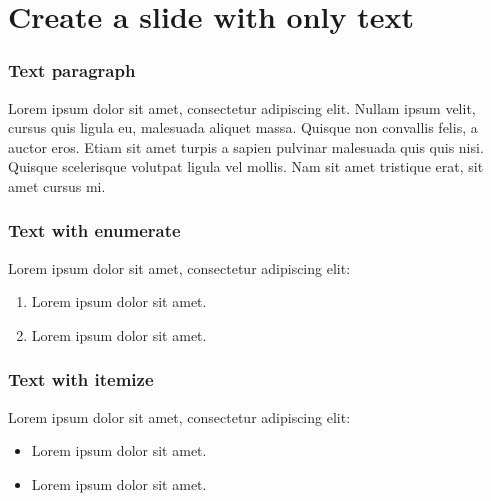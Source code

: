 
\section{Create a slide with only text} %


\begin{frame}
	\frametitle{Text paragraph}
    Lorem ipsum dolor sit amet, consectetur adipiscing elit. Nullam ipsum velit, cursus quis ligula eu, malesuada aliquet massa. Quisque non convallis felis, a auctor eros. Etiam sit amet turpis a sapien pulvinar malesuada quis quis nisi. Quisque scelerisque volutpat ligula vel mollis. Nam sit amet tristique erat, sit amet cursus mi. 
\end{frame}


\begin{frame}
	\frametitle{Text with enumerate }
     Lorem ipsum dolor sit amet, consectetur adipiscing elit:
    \begin{enumerate}
        \item Lorem ipsum dolor sit amet.
        \item Lorem ipsum dolor sit amet.
    \end{enumerate}
	
\end{frame}


\begin{frame}
	\frametitle{Text with itemize}
     Lorem ipsum dolor sit amet, consectetur adipiscing elit:
    \begin{itemize}
        \item Lorem ipsum dolor sit amet.
        \item Lorem ipsum dolor sit amet.
    \end{itemize}
	
\end{frame}


